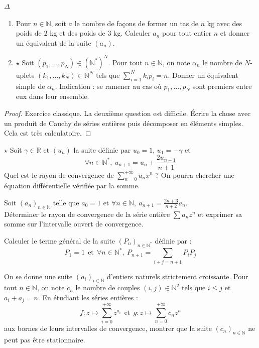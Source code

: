 \documentclass[french,a4paper]{article}
\newcommand{\N}{\mathbb{N}}
\newcommand{\R}{\mathbb{R}}
\newcommand{\st}{^*}
\theoremstyle{plain}
\theoremstyle{definition}
\theoremstyle{remark}
\begin{document}
\begin{ex}[Moulin.SE.20 / X]{$\Delta$}
	\begin{enumerate}
		\item Pour $n\in\N$, soit $a$ le nombre de façons de former un tas de $n$ kg avec des poids de $2$ kg et des poids de $3$ kg. Calculer $a_n$ pour tout entier $n$ et donner un équivalent de la suite $(a_n)$.
		\item $\star$ Soit $(p_1,\ldots,p_N)\in(\N\st)^N$. Pour tout $n\in\N$, on note $\alpha_n$ le nombre de $N$-uplets $(k_1,\ldots,k_N)\in\N^N$ tels que $\displaystyle\sum_{i=1}^{N}k_ip_i=n$. Donner un équivalent simple de $\alpha_n$. Indication : se ramener au cas où $p_1,\ldots,p_N$ sont premiers entre eux dans leur ensemble.
	\end{enumerate}
\end{ex}
\begin{proof}
	Exercice classique. La deuxième question est difficile. Écrire la chose avec un produit de Cauchy de séries entières puis décomposer en éléments simples. Cela est très calculatoire.
\end{proof}

\begin{ex}[Moulin.SE.21]{$\star$}
	Soit $\gamma\in\R$ et $(u_n)$ la suite définie par $u_0=1$, $u_1=-\gamma$ et $$\forall n\in\N\st,\ u_{n+1}=u_n+\frac{2u_{n-1}}{n+1}$$ Quel est le rayon de convergence de $\displaystyle\sum_{n=0}^{+\infty}u_nx^n$ ? On pourra chercher une équation différentielle vérifiée par la somme. 
\end{ex}

\begin{ex}[Moulin.SE.22]{}
	Soit $(a_n)_{n\in\N}$ telle que $a_0=1$ et $\forall n\in\N,\ a_{n+1}=\displaystyle\frac{2n+3}{n+2}a_n$. \\ Déterminer le rayon de convergence de la série entière $\displaystyle\sum a_nz^n$ et exprimer sa somme sur l'intervalle ouvert de convergence.
\end{ex}

\begin{ex}[Moulin.SE.23]{}
	Calculer le terme général de la suite $(P_n)_{n\in\N\st}$ définie par : $$P_1=1\ \ \text{et}\ \ \forall n\in\N\st,\ P_{n+1}=\sum_{i+j=n+1}P_iP_j$$
\end{ex}

\begin{ex}[Moulin.SE.24]{}
	On se donne une suite $(a_i)_{i\in\N}$ d'entiers naturels strictement croissante. Pour tout $n\in\N$, on note $c_n$ le nombre de couples $(i,j)\in\N^2$ tels que $i\leqslant j$ et $a_i+a_j=n$. En étudiant les séries entières : $$f:z\mapsto\sum_{i=0}^{+\infty}z^{a_i}\ \ \text{et}\ \ g:z\mapsto\sum_{n=0}^{+\infty}c_nz^n$$ aux bornes de leurs intervalles de convergence, montrer que la suite $(c_n)_{n\in\N}$ ne peut pas être stationnaire.
\end{ex}
\end{document}

